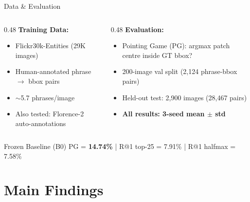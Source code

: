 \documentclass[aspectratio=169,12pt]{beamer}
\begin{document}
\begin{frame}{Data \& Evaluation}
  \begin{columns}[T]
    \begin{column}{0.48\textwidth}
      \textbf{Training Data:}
      \begin{itemize}
        \item Flickr30k-Entities (29K images)
        \item Human-annotated phrase $\to$ bbox pairs
        \item $\sim$5.7 phrases/image
        \item Also tested: Florence-2 auto-annotations
      \end{itemize}
    \end{column}
    \begin{column}{0.48\textwidth}
      \textbf{Evaluation:}
      \begin{itemize}
        \item \alert{Pointing Game (PG)}: argmax patch centre inside GT bbox?
        \item 200-image val split (2,124 phrase-bbox pairs)
        \item Held-out test: 2,900 images (28,467 pairs)
        \item \textbf{All results: 3-seed mean $\pm$ std}
      \end{itemize}
    \end{column}
  \end{columns}

  \vspace{1em}
  \begin{block}{Frozen Baseline (B0)}
    PG = \textbf{14.74\%} \quad|\quad
    R@1 top-25 = 7.91\% \quad|\quad
    R@1 halfmax = 7.58\%
  \end{block}
\end{frame}

\section{Main Findings}
\end{document}
